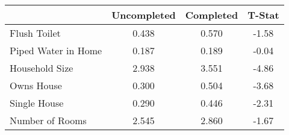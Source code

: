 \begin{tabular}{l*{1}{ccc}}
 &Uncompleted &Completed &T-Stat  \\
\hline 
Flush Toilet &      0.438 &      0.570 &      -1.58  \\
Piped Water in Home &      0.187 &      0.189 &      -0.04  \\
Household Size &      2.938 &      3.551 &      -4.86  \\
Owns House &      0.300 &      0.504 &      -3.68  \\
Single House &      0.290 &      0.446 &      -2.31  \\
Number of Rooms &      2.545 &      2.860 &      -1.67  \\
\hline
\end{tabular}